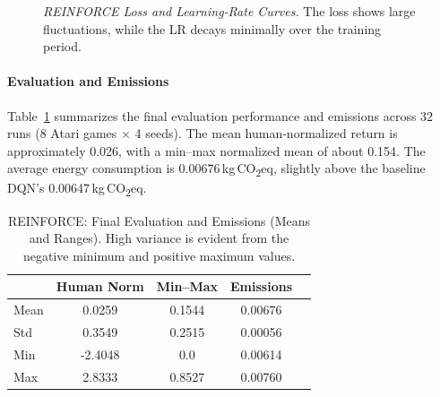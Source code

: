 \begin{figure}
	\centering
	\quad
	\caption{\textit{REINFORCE Loss and Learning‐Rate Curves.} 
		The loss shows large fluctuations, while the LR decays minimally over the training period.}
	\label{fig:reinforce_trainmetrics2}
\end{figure}

\paragraph{Evaluation and Emissions}
Table~\ref{tab:reinforce_evalstats} summarizes the final evaluation performance and emissions across 32 runs (8 Atari games $\times$ 4 seeds). The mean human‐normalized return is approximately \num{0.026}, with a min–max normalized mean of about 0.154. The average energy consumption is \num{0.00676}\,kg\,CO\textsubscript{2}eq, slightly above the baseline DQN's \num{0.00647}\,kg\,CO\textsubscript{2}eq.

\begin{table}
	\caption{REINFORCE: Final Evaluation and Emissions (Means and Ranges). 
		High variance is evident from the negative minimum and positive maximum values.}
	\label{tab:reinforce_evalstats}
	\centering
	\begin{tabular}{lcccc}
		\toprule
		& \textbf{Human Norm} & \textbf{Min--Max} & \textbf{Emissions} \\
		\midrule
		Mean & 0.0259 & 0.1544 & 0.00676 \\
		Std  & 0.3549 & 0.2515 & 0.00056 \\
		Min  & -2.4048 & 0.0    & 0.00614 \\
		Max  & 2.8333 & 0.8527 & 0.00760 \\
		\bottomrule
	\end{tabular}
\end{table}

